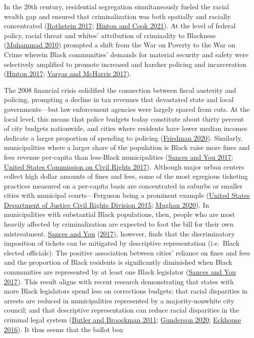 \documentclass[
  12pt,
]{article}
\begin{document}
In the 20th century, residential segregation simultaneously fueled the racial wealth gap and ensured that criminalization was both spatially and racially concentrated (\protect\hyperlink{ref-Rothstein2017}{Rothstein 2017}; \protect\hyperlink{ref-Hinton2021}{Hinton and Cook 2021}). At the level of federal policy, racial threat and whites' attribution of criminality to Blackness (\protect\hyperlink{ref-Muhammad2010}{Muhammad 2010}) prompted a shift from the War on Poverty to the War on Crime wherein Black communities' demands for material security and safety were selectively amplified to promote increased and harsher policing and incarceration (\protect\hyperlink{ref-Hinton2017}{Hinton 2017}; \protect\hyperlink{ref-Vargas2017}{Vargas and McHarris 2017}).

The 2008 financial crisis solidified the connection between fiscal austerity and policing, prompting a decline in tax revenues that devastated state and local governments---but law enforcement agencies were largely spared from cuts. At the local level, this means that police budgets today constitute about thirty percent of city budgets nationwide, and cities where residents have lower median incomes dedicate a larger proportion of spending to policing (\protect\hyperlink{ref-Friedman2020}{Friedman 2020}). Similarly, municipalities where a larger share of the population is Black raise more fines and fees revenue per-capita than less-Black municipalities (\protect\hyperlink{ref-Sances2017}{Sances and You 2017}; \protect\hyperlink{ref-UnitedStatesCommissiononCivilRights2017}{United States Commission on Civil Rights 2017}). Although major urban centers collect high dollar amounts of fines and fees, some of the most egregious ticketing practices measured on a per-capita basis are concentrated in suburbs or smaller cities with municipal courts---Ferguson being a prominent example (\protect\hyperlink{ref-UnitedStatesDepartmentofJusticeCivilRightsDivision2015}{United States Department of Justice Civil Rights Division 2015}; \protect\hyperlink{ref-Mughan2020}{Mughan 2020}). In municipalities with substantial Black populations, then, people who are most heavily affected by criminalization are expected to foot the bill for their own mistreatment. \protect\hyperlink{ref-Sances2017}{Sances and You} (\protect\hyperlink{ref-Sances2017}{2017}), however, finds that the discriminatory imposition of tickets can be mitigated by descriptive representation (i.e.~Black elected officials): The positive association between cities' reliance on fines and fees and the proportion of Black residents is significantly diminished when Black communities are represented by at least one Black legislator (\protect\hyperlink{ref-Sances2017}{Sances and You 2017}). This result aligns with recent research demonstrating that states with more Black legislators spend less on corrections budgets; that racial disparities in arrests are reduced in municipalities represented by a majority-nonwhite city council; and that descriptive representation can reduce racial disparities in the criminal legal system (\protect\hyperlink{ref-Butler2011}{Butler and Broockman 2011}; \protect\hyperlink{ref-Gunderson2020}{Gunderson 2020}; \protect\hyperlink{ref-Eckhouse2016}{Eckhouse 2016}). It thus seems that the ballot box 
\end{document}
